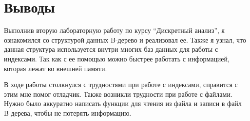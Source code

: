 \section{Выводы}

Выполнив вторую лабораторную работу по курсу \enquote{Дискретный анализ}, 
я ознакомился со структурой данных B-дерево и реализовал ее. Также я узнал, 
что данная структура используется внутри многих баз данных для работы с индексами. 
Так как с ее помощью можно быстрее работать с информацией, которая лежат во внешней памяти.

В ходе работы столкнулся с трудностями при работе с индексами, справится с этим мне помог отладчик.
Также возникли трудности при работе с файлами. 
Нужно было аккуратно написать функции для чтения из файла и записи в файл B-дерева, чтобы не потерять информацию.
\pagebreak
